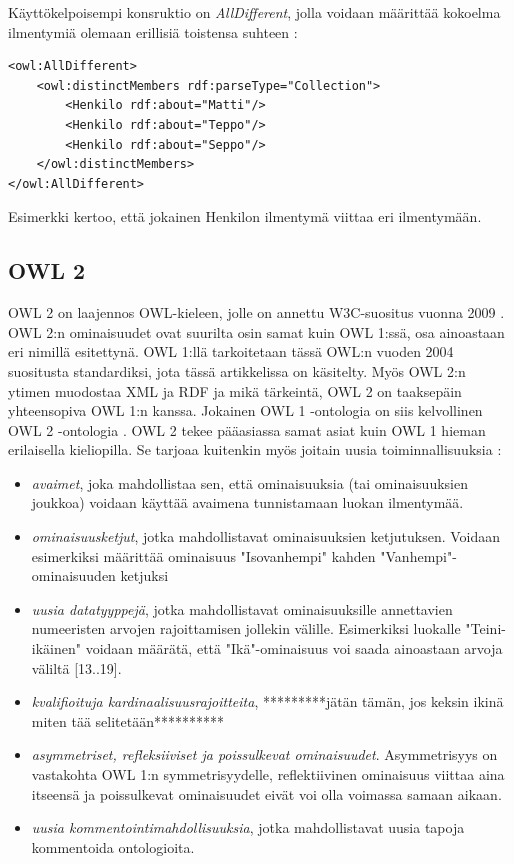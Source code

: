 \documentclass[finnish]{tktltiki2}
\theoremstyle{definition}
\theoremstyle{remark}
\begin{document}
Käyttökelpoisempi konsruktio on \textit{AllDifferent}, jolla voidaan määrittää kokoelma ilmentymiä olemaan erillisiä toistensa suhteen \cite{SWM04}:
\begin{verbatim}
<owl:AllDifferent>
    <owl:distinctMembers rdf:parseType="Collection">
        <Henkilo rdf:about="Matti"/>
        <Henkilo rdf:about="Teppo"/>
        <Henkilo rdf:about="Seppo"/>
    </owl:distinctMembers>
</owl:AllDifferent>
\end{verbatim}
Esimerkki kertoo, että jokainen Henkilon ilmentymä viittaa eri ilmentymään. 

\subsection{OWL 2}
OWL 2 on laajennos OWL-kieleen, jolle on annettu W3C-suositus vuonna 2009 \cite{OWL2}. OWL 2:n ominaisuudet ovat suurilta osin samat kuin OWL 1:ssä, osa ainoastaan eri nimillä esitettynä. OWL 1:llä tarkoitetaan tässä OWL:n vuoden 2004 suositusta standardiksi, jota tässä artikkelissa on käsitelty.  Myös OWL 2:n ytimen muodostaa XML ja RDF ja mikä tärkeintä, OWL 2 on taaksepäin yhteensopiva OWL 1:n kanssa. Jokainen OWL 1 -ontologia on siis kelvollinen OWL 2 -ontologia \cite{OWL2}. OWL 2 tekee pääasiassa samat asiat kuin OWL 1 hieman erilaisella kieliopilla. Se tarjoaa kuitenkin myös   joitain uusia toiminnallisuuksia \cite{OWL2}: 
\begin{itemize}
\item \textit{avaimet}, joka mahdollistaa sen, että ominaisuuksia (tai ominaisuuksien joukkoa) voidaan käyttää avaimena tunnistamaan luokan ilmentymää.
\item \textit{ominaisuusketjut}, jotka mahdollistavat ominaisuuksien ketjutuksen. Voidaan esimerkiksi määrittää ominaisuus "Isovanhempi" kahden "Vanhempi"-ominaisuuden ketjuksi
\item \textit{uusia datatyyppejä}, jotka mahdollistavat ominaisuuksille annettavien numeeristen arvojen rajoittamisen jollekin välille. Esimerkiksi luokalle "Teini-ikäinen" voidaan määrätä, että "Ikä"-ominaisuus voi saada ainoastaan arvoja väliltä [13..19].
\item \textit{kvalifioituja kardinaalisuusrajoitteita}, *********jätän tämän, jos keksin ikinä miten tää selitetään**********
\item \textit{asymmetriset, refleksiiviset ja poissulkevat ominaisuudet}. Asymmetrisyys on vastakohta OWL 1:n symmetrisyydelle, reflektiivinen ominaisuus viittaa aina itseensä ja poissulkevat ominaisuudet eivät voi olla voimassa samaan aikaan. 
\item \textit{uusia kommentointimahdollisuuksia}, jotka mahdollistavat uusia tapoja kommentoida ontologioita.   
\end{itemize}
\end{document}
